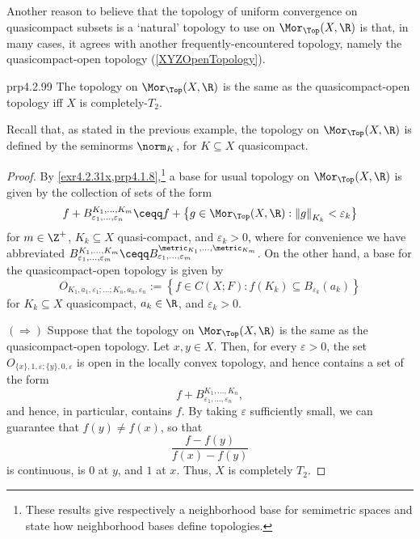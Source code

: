 Another reason to believe that the topology of uniform convergence on quasicompact subsets is a `natural' topology to use on $\Mor _{\Top}(X,\R )$ is that, in many cases, it agrees with another frequently-encountered topology, namely the quasicompact-open topology (\cref{XYZOpenTopology}).
\begin{prp}{}{prp4.2.99}
	The topology on $\Mor _{\Top}(X,\R )$ is the same as the quasicompact-open topology iff $X$ is completely-$T_2$.
	\begin{rmk}
		Recall that, as stated in the previous example, the topology on $\Mor _{\Top}(X,\R )$ is defined by the seminorms $\norm _K$, for $K\subseteq X$ quasicompact.
	\end{rmk}
	\begin{proof}
		By \cref{exr4.2.31x,prp4.1.8},\footnote{These results give respectively a neighborhood base for semimetric spaces and state how neighborhood bases define topologies.} a base for usual topology on $\Mor _{\Top}(X,\R )$ is given by the collection of sets of the form
		\begin{equation}\label{2.20}
			f+B_{\varepsilon _1,\ldots ,\varepsilon _n}^{K_1,\ldots ,K_m}\ceqq f+\left\{ g\in \Mor _{\Top}(X,\R ):\left\| g\right\| _{K_k}<\varepsilon _k\right\}
		\end{equation}
		for $m\in \Z ^+$, $K_k\subseteq X$ quasi-compact, and $\varepsilon _k>0$, where for convenience we have abbreviated $B_{\varepsilon _1,\ldots ,\varepsilon _m}^{K_1,\ldots ,K_m}\ceqq B_{\varepsilon _1,\ldots ,\varepsilon _m}^{\metric _{K_1},\ldots ,\metric _{K_m}}$.  On the other hand, a base for the quasicompact-open topology is given by
		\begin{equation}\label{2.21}
			O_{K_1,a_1,\varepsilon _1;\ldots ;K_n,a_n,\varepsilon _n}:=\left\{ f\in C(X;F):f(K_k)\subseteq B_{\varepsilon _k}(a_k)\right\}
		\end{equation}
		for $K_k\subseteq X$ quasicompact, $a_k\in \R$, and $\varepsilon _k>0$.
		
		\blni
		$(\Rightarrow )$ Suppose that the topology on $\Mor _{\Top}(X,\R )$ is the same as the quasicompact-open topology.  Let $x,y\in X$.  Then, for every $\varepsilon >0$, the set $O_{\{ x\} ,1,\varepsilon ;\{ y\} ,0,\varepsilon}$ is open in the locally convex topology, and hence contains a set of the form
		\begin{equation}
		f+B_{\varepsilon _1,\ldots ,\varepsilon _n}^{K_1,\ldots ,K_n},
		\end{equation}
		and hence, in particular, contains $f$.  By taking $\varepsilon$ sufficiently small, we can guarantee that $f(y)\neq f(x)$, so that
		\begin{equation}
		\frac{f-f(y)}{f(x)-f(y)}
		\end{equation}
		is continuous, is $0$ at $y$, and $1$ at $x$.  Thus, $X$ is completely $T_2$.
		

\end{proof}
\end{prp}
